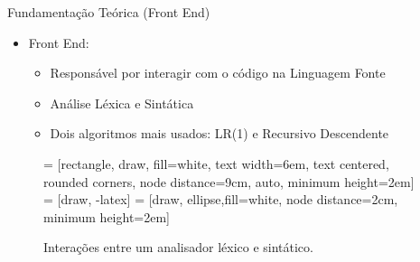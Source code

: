 \begin{frame}{Fundamentação Teórica (Front End)}
    \begin{itemize}
        \item Front End:
        \begin{itemize}
            \item Responsável por interagir com o código na Linguagem Fonte
            \item Análise Léxica e Sintática
            \item Dois algoritmos mais usados: LR(1) e Recursivo Descendente
        \end{itemize}
    \end{itemize}
\begin{figure}
 = [rectangle, draw, fill=white,
    text width=6em, text centered, rounded corners, node distance=9cm, auto, minimum height=2em]
 = [draw, -latex]
 = [draw, ellipse,fill=white, node distance=2cm,
    minimum height=2em]

\begin{center}
\end{center}

\caption{Interações entre um analisador léxico e sintático.}
\label{fig:lexico_sintatico}
\end{figure}

\end{frame}



